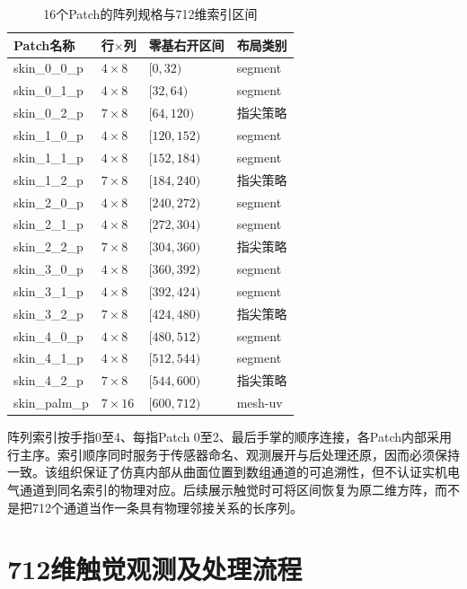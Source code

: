 \begin{table}[htbp]
  \centering\small
  \caption{16个Patch的阵列规格与712维索引区间}
  \label{tab:ch02_patch_layout}
  \begin{tabular}{llll}
    \hline
    Patch名称 & 行$\times$列 & 零基右开区间 & 布局类别\\
    \hline
    skin\_0\_0\_p & $4\times8$ & $[0,32)$ & segment\\
    skin\_0\_1\_p & $4\times8$ & $[32,64)$ & segment\\
    skin\_0\_2\_p & $7\times8$ & $[64,120)$ & 指尖策略\\
    skin\_1\_0\_p & $4\times8$ & $[120,152)$ & segment\\
    skin\_1\_1\_p & $4\times8$ & $[152,184)$ & segment\\
    skin\_1\_2\_p & $7\times8$ & $[184,240)$ & 指尖策略\\
    skin\_2\_0\_p & $4\times8$ & $[240,272)$ & segment\\
    skin\_2\_1\_p & $4\times8$ & $[272,304)$ & segment\\
    skin\_2\_2\_p & $7\times8$ & $[304,360)$ & 指尖策略\\
    skin\_3\_0\_p & $4\times8$ & $[360,392)$ & segment\\
    skin\_3\_1\_p & $4\times8$ & $[392,424)$ & segment\\
    skin\_3\_2\_p & $7\times8$ & $[424,480)$ & 指尖策略\\
    skin\_4\_0\_p & $4\times8$ & $[480,512)$ & segment\\
    skin\_4\_1\_p & $4\times8$ & $[512,544)$ & segment\\
    skin\_4\_2\_p & $7\times8$ & $[544,600)$ & 指尖策略\\
    skin\_palm\_p & $7\times16$ & $[600,712)$ & mesh-uv\\
    \hline
  \end{tabular}
\end{table}

阵列索引按手指0至4、每指Patch 0至2、最后手掌的顺序连接，各Patch内部采用行主序。索引顺序同时服务于传感器命名、观测展开与后处理还原，因而必须保持一致。该组织保证了仿真内部从曲面位置到数组通道的可追溯性，但不认证实机电气通道到同名索引的物理对应。后续展示触觉时可将区间恢复为原二维方阵，而不是把712个通道当作一条具有物理邻接关系的长序列。

\section{712维触觉观测及处理流程}
\label{sec:tactile_processing}

